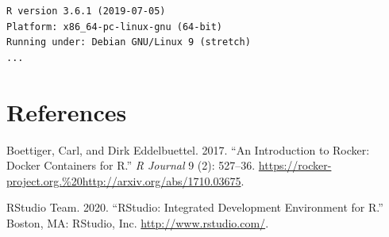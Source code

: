\documentclass[
]{article}
\newlength{\cslhangindent}
\newenvironment{cslreferences}%
  {\setlength{\parindent}{0pt}%
  \everypar{\setlength{\hangindent}{\cslhangindent}}\ignorespaces}%
  {\par}
\begin{document}
\begin{verbatim}
R version 3.6.1 (2019-07-05)
Platform: x86_64-pc-linux-gnu (64-bit)
Running under: Debian GNU/Linux 9 (stretch)
...
\end{verbatim}

\clearpage

\hypertarget{references}{%
\section*{References}\label{references}}

\hypertarget{refs}{}
\begin{cslreferences}
\leavevmode\hypertarget{ref-Boettiger2017}{}%
Boettiger, Carl, and Dirk Eddelbuettel. 2017. ``An Introduction to Rocker: Docker Containers for R.'' \emph{R Journal} 9 (2): 527--36. \url{https://rocker-project.org.\%20http://arxiv.org/abs/1710.03675}.

\leavevmode\hypertarget{ref-RStudioTeam2020}{}%
RStudio Team. 2020. ``RStudio: Integrated Development Environment for R.'' Boston, MA: RStudio, Inc. \url{http://www.rstudio.com/}.
\end{cslreferences}
\end{document}
